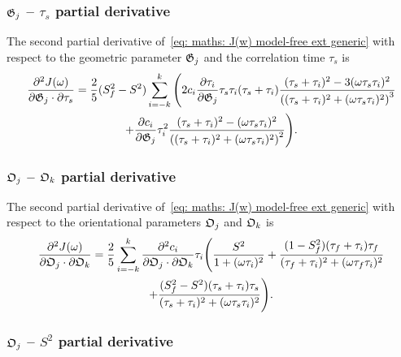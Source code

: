 \subsubsection{$\mathfrak{G}_j$ -- $\tau_s$ partial derivative}

The second partial derivative of~\eqref{eq: maths: J(w) model-free ext generic} with respect to the geometric parameter $\mathfrak{G}_j$ and the correlation time $\tau_s$ is
\begin{multline}
    \frac{\partial^2 J(\omega)}{\partial \mathfrak{G}_j \cdot \partial \tau_s} = \frac{2}{5} (S^2_f - S^2) \sum_{i=-k}^k \Bigg(
        2 c_i \frac{\partial \tau_i}{\partial \mathfrak{G}_j} \tau_s \tau_i (\tau_s + \tau_i)
            \frac{(\tau_s + \tau_i)^2 - 3(\omega \tau_s \tau_i)^2}{\left((\tau_s + \tau_i)^2 + (\omega \tau_s \tau_i)^2 \right)^3}  \\
        + \frac{\partial c_i}{\partial \mathfrak{G}_j} \tau_i^2 \frac{(\tau_s + \tau_i)^2 - (\omega \tau_s \tau_i)^2}{\left((\tau_s + \tau_i)^2 + (\omega \tau_s \tau_i)^2 \right)^2}
    \Bigg).
\end{multline}



\subsubsection{$\mathfrak{O}_j$ -- $\mathfrak{O}_k$ partial derivative}

The second partial derivative of~\eqref{eq: maths: J(w) model-free ext generic} with respect to the orientational parameters $\mathfrak{O}_j$ and $\mathfrak{O}_k$ is
\begin{multline}
    \frac{\partial^2 J(\omega)}{\partial \mathfrak{O}_j \cdot \partial \mathfrak{O}_k} = \frac{2}{5} \sum_{i=-k}^k
        \frac{\partial^2 c_i}{\partial \mathfrak{O}_j \cdot \partial \mathfrak{O}_k} \tau_i \Bigg(
            \frac{S^2}{1 + (\omega \tau_i)^2}
            + \frac{(1 - S^2_f)(\tau_f + \tau_i)\tau_f}{(\tau_f + \tau_i)^2 + (\omega \tau_f \tau_i)^2} \\
            + \frac{(S^2_f - S^2)(\tau_s + \tau_i)\tau_s}{(\tau_s + \tau_i)^2 + (\omega \tau_s \tau_i)^2}
        \Bigg).
\end{multline}



\subsubsection{$\mathfrak{O}_j$ -- $S^2$ partial derivative}

